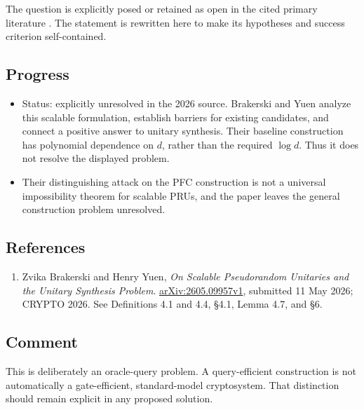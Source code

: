 The question is explicitly posed or retained as open in the cited primary literature .  The statement is rewritten here to make its hypotheses and success criterion self-contained.

\subsection*{Progress}

\begin{itemize}
  \item Status: explicitly unresolved in the 2026 source. Brakerski and Yuen analyze this scalable formulation, establish barriers for existing candidates, and connect a positive answer to unitary synthesis. Their baseline construction has polynomial dependence on $d$, rather than the required $\log d$. Thus it does not resolve the displayed problem. 

  \item Their distinguishing attack on the PFC construction is not a universal impossibility theorem for scalable PRUs, and the paper leaves the general construction problem unresolved. 
\end{itemize}

\subsection*{References}

\begin{enumerate}[label={},leftmargin=4.8em,labelsep=0.5em]
  \footnotesize
  \item[\textup{[Brakerski26]}]\label{ref:f271-brakerski26}
  Zvika Brakerski and Henry Yuen, \emph{On Scalable Pseudorandom Unitaries and the Unitary Synthesis Problem}. \href{https://arxiv.org/html/2605.09957v1}{arXiv:2605.09957v1}, submitted 11 May 2026; CRYPTO 2026. See Definitions 4.1 and 4.4, §4.1, Lemma 4.7, and §6.
\end{enumerate}

\subsection*{Comment}

This is deliberately an oracle-query problem. A query-efficient construction is not automatically a gate-efficient, standard-model cryptosystem. That distinction should remain explicit in any proposed solution.

